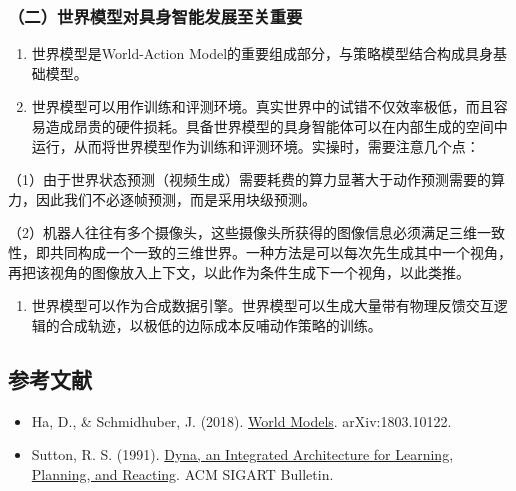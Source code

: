 \hypertarget{ux4e8cux4e16ux754cux6a21ux578bux5bf9ux5177ux8eabux667aux80fdux53d1ux5c55ux81f3ux5173ux91cdux8981}{%
\subsubsection{（二）世界模型对具身智能发展至关重要}\label{ux4e8cux4e16ux754cux6a21ux578bux5bf9ux5177ux8eabux667aux80fdux53d1ux5c55ux81f3ux5173ux91cdux8981}}

\begin{enumerate}
\def\labelenumi{\arabic{enumi}.}
\item
  世界模型是World-Action Model的重要组成部分，与策略模型结合构成具身基础模型。
\item
{}
  世界模型可以用作训练和评测环境。真实世界中的试错不仅效率极低，而且容易造成昂贵的硬件损耗。具备世界模型的具身智能体可以在内部生成的空间中运行，从而将世界模型作为训练和评测环境。实操时，需要注意几个点：
\end{enumerate}

（1）由于世界状态预测（视频生成）需要耗费的算力显著大于动作预测需要的算力，因此我们不必逐帧预测，而是采用块级预测。

（2）机器人往往有多个摄像头，这些摄像头所获得的图像信息必须满足三维一致性，即共同构成一个一致的三维世界。一种方法是可以每次先生成其中一个视角，再把该视角的图像放入上下文，以此作为条件生成下一个视角，以此类推。

\begin{enumerate}
\def\labelenumi{\arabic{enumi}.}
\setcounter{enumi}{2}
\tightlist
\item
  世界模型可以作为合成数据引擎。世界模型可以生成大量带有物理反馈交互逻辑的合成轨迹，以极低的边际成本反哺动作策略的训练。
\end{enumerate}

\FloatBarrier
{}
\hypertarget{ux53c2ux8003ux6587ux732e-154}{%
\subsection{参考文献}\label{ux53c2ux8003ux6587ux732e-154}}

\vspace{0.25em}
\begin{itemize}
\tightlist
\item
  Ha, D., \& Schmidhuber, J. (2018). \href{https://arxiv.org/abs/1803.10122}{World Models}. arXiv:1803.10122.
\item
  Sutton, R. S. (1991). \href{https://dl.acm.org/doi/10.1145/122344.122377}{Dyna, an Integrated Architecture for Learning, Planning, and Reacting}. ACM SIGART Bulletin.
\end{itemize}

\clearpage
